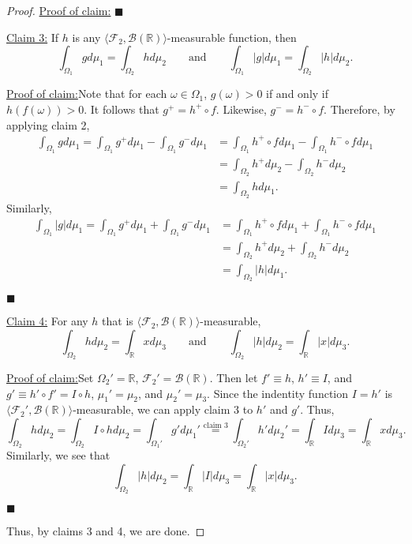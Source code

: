 \documentclass[12pt]{article}
\newenvironment{claimproof}[1]{\par\noindent\underline{Proof of claim:}\space#1}{\hfill $\blacksquare$\vspace{3mm}}
\begin{document}
\begin{proof}
\begin{claimproof}
\vspace{-10mm}
\end{claimproof}

\underline{Claim 3:} If $h$ is any $\langle\mathcal{F}_{2},\mathcal{B}(\mathbb{R})\rangle$-measurable function, then 
\[ \int_{\Omega_{1}}gd\mu_{1} = \int_{\Omega_{2}}hd\mu_{2} \qquad \text{and} \qquad \int_{\Omega_{1}}|g|d\mu_{1} = \int_{\Omega_{2}}|h|d\mu_{2}. \]
\begin{claimproof}
Note that for each $\omega \in \Omega_{1}$, $g(\omega) > 0$ if and only if $h(f(\omega)) > 0$. It follows that $g^{+} = h^{+}\circ f$. 
Likewise, $g^{-} = h^{-}\circ f$. Therefore, by applying claim 2,
\begin{align*}
\int_{\Omega_{1}}gd\mu_{1} = \int_{\Omega_{1}}g^{+}d\mu_{1} - \int_{\Omega_{1}}g^{-}d\mu_{1} & = \int_{\Omega_{1}}h^{+}\circ fd\mu_{1} -
\int_{\Omega_{1}}h^{-}\circ fd\mu_{1} \\
& = \int_{\Omega_{2}}h^{+}d\mu_{2} - \int_{\Omega_{2}}h^{-}d\mu_{2} \\
& = \int_{\Omega_{2}}hd\mu_{1}.
\end{align*}
Similarly,
\begin{align*}
\int_{\Omega_{1}}|g|d\mu_{1} = \int_{\Omega_{1}}g^{+}d\mu_{1} + \int_{\Omega_{1}}g^{-}d\mu_{1} & = \int_{\Omega_{1}}h^{+}\circ fd\mu_{1} +
\int_{\Omega_{1}}h^{-}\circ fd\mu_{1} \\
& = \int_{\Omega_{2}}h^{+}d\mu_{2} + \int_{\Omega_{2}}h^{-}d\mu_{2} \\
& = \int_{\Omega_{2}}|h|d\mu_{1}.
\end{align*}

\vspace{-10mm}
\end{claimproof}

\underline{Claim 4:} For any $h$ that is $\langle\mathcal{F}_{2},\mathcal{B}(\mathbb{R})\rangle$-measurable, 
\[ \int_{\Omega_{2}}hd\mu_{2} = \int_{\mathbb{R}}xd\mu_{3} \qquad \text{and} \qquad \int_{\Omega_{2}}|h|d\mu_{2} = \int_{\mathbb{R}}|x|d\mu_{3}. \]
\begin{claimproof}
Set $\Omega_{2}' = \mathbb{R}$, $\mathcal{F}_{2}' = \mathcal{B}(\mathbb{R})$. Then let $f' \equiv h$, $h' \equiv I$, and $g' \equiv h'\circ f' = I\circ
h$, $\mu_{1}' = \mu_{2}$, and $\mu_{2}' = \mu_{3}$. Since the indentity function $I = h'$ is $\langle \mathcal{F}_{2}', \mathcal{B}(\mathbb{R})\rangle$-measurable, we can apply claim 3 to $h'$
and $g'$. Thus,
\[ \int_{\Omega_{2}}hd\mu_{2} = \int_{\Omega_{2}}I\circ hd\mu_{2} = \int_{\Omega_{1}'}g'd\mu_{1}' \stackrel{\text{claim 3}}{=} \int_{\Omega_{2}'}h'd\mu_{2}' = 
\int_{\mathbb{R}}Id\mu_{3} = \int_{\mathbb{R}}xd\mu_{3}. \]
Similarly, we see that 
\[ \int_{\Omega_{2}}|h|d\mu_{2} = \int_{\mathbb{R}}|I|d\mu_{3} = \int_{\mathbb{R}}|x|d\mu_{3}. \]

\vspace{-10mm}
\end{claimproof}

Thus, by claims 3 and 4, we are done.
\end{proof}
\end{document}
